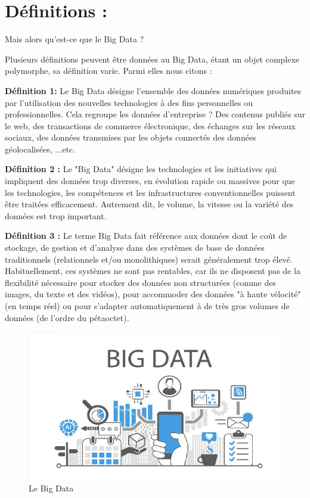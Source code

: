 \section{Définitions : }
\begin{center}
\color[rgb]{0.2, 0.6, 0.2} Mais alors qu’est-ce que le Big Data ?
\end{center}

Plusieurs définitions peuvent être données au Big Data, étant un objet complexe polymorphe, sa définition varie. Parmi elles nous citons :

\textbf{Définition 1:} Le Big Data désigne l'ensemble des données numériques produites par l'utilisation des nouvelles technologies à des fins personnelles ou professionnelles. Cela regroupe les données d'entreprise ? Des contenus publiés sur le web, des transactions de commerce électronique, des échanges sur les réseaux sociaux, des données transmises par les objets connectés des données géolocalisées, ...etc.

\textbf{Définition 2 :} Le "Big Data" désigne les technologies et les initiatives qui impliquent des données trop diverses, en évolution rapide ou massives pour que les technologies, les compétences et les infrastructures conventionnelles puissent être traitées efficacement. Autrement dit, le volume, la vitesse ou la variété des données est trop important.

\textbf{Définition 3 :} Le terme Big Data fait référence aux données dont le coût de stockage, de gestion et d'analyse dans des systèmes de base de données traditionnels (relationnels et/ou monolithiques) serait généralement trop élevé. Habituellement, ces systèmes ne sont pas rentables, car ils ne disposent pas de la flexibilité nécessaire pour stocker des données non structurées (comme des images, du texte et des vidéos), pour accommoder des données "à haute vélocité" (en temps réel) ou pour s'adapter automatiquement à de très gros volumes de données (de l'ordre du pétaoctet).

\begin{figure}[h]
 \centering
 \includegraphics[scale=0.6]{img/fig10_}
 \caption{Le Big Data}
\end{figure}